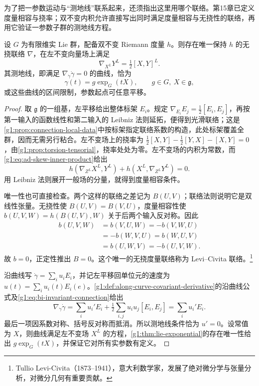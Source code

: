 为了把一参数运动与“测地线”联系起来，还须指出这里用哪个联络。第15章已定义度量相容与挠率；双不变内积允许直接写出同时满足度量相容与无挠性的联络，再用它验证一参数子群的测地线方程。

\begin{proposition}\label{g1:prop:bi-invariant-geodesics}
	设 \(G\) 为有限维实 Lie 群，配备双不变 Riemann 度量 \(h\)。则存在唯一保持 \(h\) 的无挠联络 \(\nabla\)，在左不变向量场上满足
	\begin{equation}\label{g1:eq:bi-invariant-connection}
		\nabla_{X^L}Y^L=\tfrac12[X,Y]^L.
	\end{equation}
	其测地线，即满足 \(\nabla_{\dot\gamma}\dot\gamma=0\) 的曲线，恰为
	\[
		\gamma(t)=g\exp_G(tX),\qquad g\in G,\ X\in\mathfrak g,
	\]
	或这些曲线的区间限制，参数起点可任意平移。
\end{proposition}
\begin{proof}
	取 \(\mathfrak g\) 的一组基，左平移给出整体标架 \(E_i\)。规定 \(\nabla_{E_i}E_j=\tfrac12[E_i,E_j]\)，再按第一输入的函数线性和第二输入的 Leibniz 法则延拓，便得到光滑联络；这是\cref{g1:prop:connection-local-data}中按标架指定联络系数的构造，此处标架覆盖全群，因而无需另行粘合。左不变场上的挠率为 \(\tfrac12[X,Y]-\tfrac12[Y,X]-[X,Y]=0\)，由\cref{g1:prop:torsion-tensorial}，挠率处处为零。左不变场的内积为常数，而\eqref{g1:eq:ad-skew-inner-product}给出
	\[
		h(\nabla_{Z^L}X^L,Y^L)+h(X^L,\nabla_{Z^L}Y^L)=0.
	\]
	用 Leibniz 法则展开一般场的分量，就得到度量相容条件。

	唯一性也可直接检查。两个这样的联络之差记为 \(B(U,V)\)；联络法则说明它是双线性张量。无挠性使 \(B(U,V)=B(V,U)\)，度量相容性使 \(b(U,V,W)=h(B(U,V),W)\) 关于后两个输入反对称。因此
	\[
		\begin{aligned}
			b(U,V,W)&=b(V,U,W)=-b(V,W,U)\\
			&=-b(W,V,U)=b(W,U,V)\\
			&=b(U,W,V)=-b(U,V,W).
		\end{aligned}
	\]
	故 \(b=0\)，正定性推出 \(B=0\)。这个唯一的无挠度量联络称为 Levi--Civita 联络。\footnote{Tullio Levi-Civita（1873--1941），意大利数学家，发展了绝对微分学与张量分析，对微分几何有重要贡献。}

	沿曲线写 \(\dot\gamma=\sum_i u_iE_i\)，并记左平移回单位元的速度为 \(u(t)=\sum_i u_i(t)E_i(e)\)。\cref{g1:def:along-curve-covariant-derivative}的沿曲线公式及\eqref{g1:eq:bi-invariant-connection}给出
	\[
		\nabla_{\dot\gamma}\dot\gamma
		=\sum_i u_i'E_i+\tfrac12\sum_{i,j}u_iu_j[E_i,E_j]
		=\sum_i u_i'E_i.
	\]
	最后一项因系数对称、括号反对称而抵消。所以测地线条件恰为 \(u'=0\)。设常值为 \(X\)，则曲线满足左不变场 \(X^L\) 的方程，\cref{g1:thm:lie-exponential}的存在唯一性给出 \(g\exp_G(tX)\)，并保证它对所有实参数有定义。
\end{proof}

